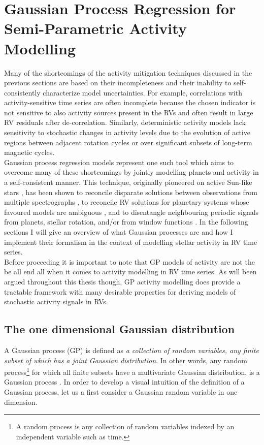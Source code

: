 \section{Gaussian Process Regression for Semi-Parametric Activity Modelling} \label{sect:gp}
Many of the shortcomings of the activity mitigation techniques discussed in the
previous sections are based on their incompleteness and their inability to
self-consistently characterize model uncertainties. For example, correlations with
activity-sensitive time series are often incomplete because the chosen indicator
is not sensitive to also activity sources present in the RVs and often result in
large RV residuals after de-correlation. Similarly, deterministic activity models
lack sensitivity to stochastic changes in activity levels due to the evolution
of active regions between adjacent rotation cycles or over
significant subsets of long-term magnetic cycles. \\

Gaussian process regression models represent one such tool which aims to overcome
many of these shortcomings by jointly modelling planets and activity in a self-consistent
manner. This technique, originally pioneered on active Sun-like stars
\citep[e.g.][]{haywood14,grunblatt15,faria16,lopezmorales16},
has been shown to reconcile disparate solutions
between observations from multiple spectrographs \citep{rajpaul17,cloutier19},
to reconcile RV solutions for planetary systems whose favoured models are
ambiguous \citep{rajpaul17,cloutier19}, and to disentangle neighbouring periodic
signals from planets, stellar rotation, and/or from window functions
\citep{rajpaul16,cloutier17b}.
In the following sections I will give an overview
of what Gaussian processes are and how I implement their formalism in the context
of modelling stellar activity in RV time series. \\

Before proceeding it is important
to note that GP models of activity are not the be all end all when it comes to activity
modelling in RV time series. As will been argued throughout this thesis though, GP activity
modelling does provide a tractable framework with many desirable properties for deriving
models of stochastic activity signals in RVs. 

\subsection{The one dimensional Gaussian distribution}
A Gaussian process (GP) is defined as \emph{a collection of random variables, any
finite subset of which has a joint Gaussian distribution}. In other words,
any random process\footnote{A random process is any collection of random
  variables indexed by an independent variable such as time.} for which all
finite subsets have a multivariate Gaussian distribution, is a Gaussian process
\citep{rasmussen05}. 
In order to develop a visual intuition of the definition of a Gaussian process,
let us a first consider a Gaussian random variable in one dimension. \\

